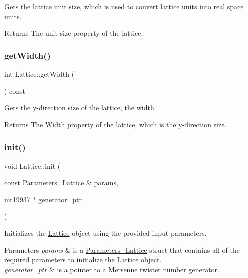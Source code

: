 Gets the lattice unit size, which is used to convert lattice units into real space units. 

\begin{DoxyReturn}{Returns}
The unit size property of the lattice. 
\end{DoxyReturn}
\mbox{\label{class_lattice_aeb60d2b8bfb02d9da8bef463f0d41428}} 
\subsubsection{\texorpdfstring{get\+Width()}{getWidth()}}
{\footnotesize\ttfamily int Lattice\+::get\+Width (\begin{DoxyParamCaption}{ }\end{DoxyParamCaption}) const}



Gets the y-\/direction size of the lattice, the width. 

\begin{DoxyReturn}{Returns}
The Width property of the lattice, which is the y-\/direction size. 
\end{DoxyReturn}
\mbox{\label{class_lattice_a4067a9617cc24fa60ca6b47fccb4c123}} 
\subsubsection{\texorpdfstring{init()}{init()}}
{\footnotesize\ttfamily void Lattice\+::init (\begin{DoxyParamCaption}\item[{const \hyperlink{struct_parameters___lattice}{Parameters\+\_\+\+Lattice} \&}]{params,  }\item[{mt19937 $\ast$}]{generator\+\_\+ptr }\end{DoxyParamCaption})}



Initializes the \hyperlink{class_lattice}{Lattice} object using the provided input parameters. 


\begin{DoxyParams}{Parameters}
{\em params} & is a \hyperlink{struct_parameters___lattice}{Parameters\+\_\+\+Lattice} struct that contains all of the required parameters to initialize the \hyperlink{class_lattice}{Lattice} object. \\
\hline
{\em generator\+\_\+ptr} & is a pointer to a Mersenne twister number generator. \\
\hline
\end{DoxyParams}
\mbox{\label{class_lattice_a4d37afb6ad4c67f4f6462c2f6d5c337d}} 
